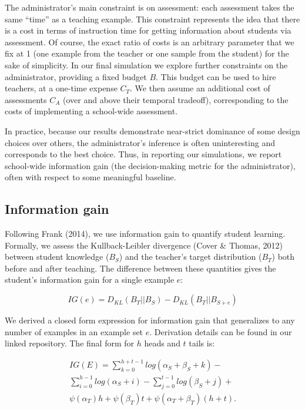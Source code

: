 \documentclass[10pt, letterpaper]{article}
\begin{document}
The administrator's main constraint is on assessment: each assessment
takes the same ``time'' as a teaching example. This constraint
represents the idea that there is a cost in terms of instruction time
for getting information about students via assessment. Of course, the
exact ratio of costs is an arbitrary parameter that we fix at 1 (one
example from the teacher or one sample from the student) for the sake of
simplicity. In our final simulation we explore further constraints on
the administrator, providing a fixed budget \(B\). This budget can be
used to hire teachers, at a one-time expense \(C_T\). We then assume an
additional cost of assessments \(C_A\) (over and above their temporal
tradeoff), corresponding to the costs of implementing a school-wide
assessment.

In practice, because our results demonstrate near-strict dominance of
some design choices over others, the administrator's inference is often
uninteresting and corresponds to the best choice. Thus, in reporting our
simulations, we report school-wide information gain (the decision-making
metric for the administrator), often with respect to some meaningful
baseline.

\subsection{Information gain}\label{information-gain}

Following Frank (2014), we use information gain to quantify student
learning. Formally, we assess the Kullback-Leibler divergence (Cover \&
Thomas, 2012) between student knowledge (\(B_S\)) and the teacher's
target distribution (\(B_T\)) both before and after teaching. The
difference between these quantities gives the student's information gain
for a single example \(e\):

\[IG(e) = D_{KL}(B_T ||B_S) - D_{KL}(B_T || B_{S+e})\]

We derived a closed form expression for information gain that
generalizes to any number of examples in an example set \(e\).
Derivation details can be found in our linked repository. The final form
for \(h\) heads and \(t\) tails is:

\begin{multline}
IG(E) = \sum_{k=0}^{h+t-1} {log(\alpha_S + \beta_S + k)} - \\
\sum_{i=0}^{h-1} {log (\alpha_S + i)} - \sum_{j=0}^{t-1} {log(\beta_S +j)} + \\
\psi(\alpha_T)h + \psi(\beta_T)t +  \psi(\alpha_T + \beta_T)(h+t).
\end{multline}
\end{document}
